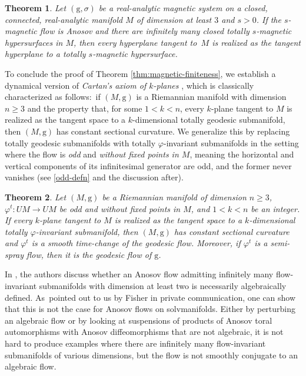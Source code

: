 \documentclass[pdftex]{sigma}
\newcommand{\g}{\mathrm{g}}
\numberwithin{equation}{section}
\newtheorem{theoremA}{Theorem}
\theoremstyle{definition}
\begin{document}
\begin{theoremA} \label{thm:vol-preserving2}
 Let $(\g, \sigma)$ be a real-analytic magnetic system on a closed, connected, real-analytic manifold $M$ of dimension at least $3$ and $s > 0$. If the $s$-magnetic flow is Anosov and there are infinitely many closed totally $s$-magnetic hypersurfaces in $M$, then \emph{every} hyperplane tangent to~$M$ is realized as the tangent hyperplane to a totally $s$-magnetic hypersurface.
\end{theoremA}

To conclude the proof of Theorem \ref{thm:magnetic-finiteness}, we establish a dynamical version of \emph{Cartan's axiom of \mbox{$k$-planes}} \cite[Theorem 1.16]{dajczer-tojeiro}, which is classically characterized as follows:\ if $(M,\g)$ is a Riemannian manifold with dimension $n \geq 3$ and the property that, for some $1<k<n$, every $k$-plane tangent to $M$ is realized as the tangent space to a $k$-dimensional totally geodesic submanifold, then $(M,\g)$ has constant sectional curvature. We generalize this by replacing totally geodesic submanifolds with totally \mbox{$\varphi$-in\-va\-ri\-ant} submanifolds in the setting where the flow is \emph{odd} and \emph{without fixed points in $M$}, meaning the horizontal and vertical components of its infinitesimal generator are odd, and the former never vanishes (see \eqref{odd-defn} and the discussion after).

\begin{theoremA}\label{dyn-Cartan}
 Let $(M,\g)$ be a Riemannian manifold of dimension $n \geq 3$, $\varphi^t\colon UM\to UM$ be odd and without fixed points in $M$, and $1<k<n$ be an integer. If every $k$-plane tangent to $M$ is realized as the tangent space to a $k$-dimensional totally $\varphi$-invariant submanifold, then $(M,\g)$ has constant sectional curvature and $\varphi^t$ is a smooth time-change of the geodesic flow. Moreover, if $\varphi^t$ is a semi-spray flow, then it is the geodesic flow of $\g$.
\end{theoremA}


In \cite[Section 4.2]{filip2024finiteness}, the authors discuss whether an Anosov flow admitting infinitely many flow-invariant submanifolds with dimension at least two is necessarily algebraically defined. As~pointed out to us by Fisher in private communication, one can show that this is not the case for Anosov flows on solvmanifolds. Either by perturbing an algebraic flow or by looking at suspensions of products of Anosov toral automorphisms with Anosov diffeomorphisms that are not algebraic, it is not hard to produce examples where there are infinitely many flow-invariant submanifolds of various dimensions, but the flow is not smoothly conjugate to an algebraic flow.
\end{document}
